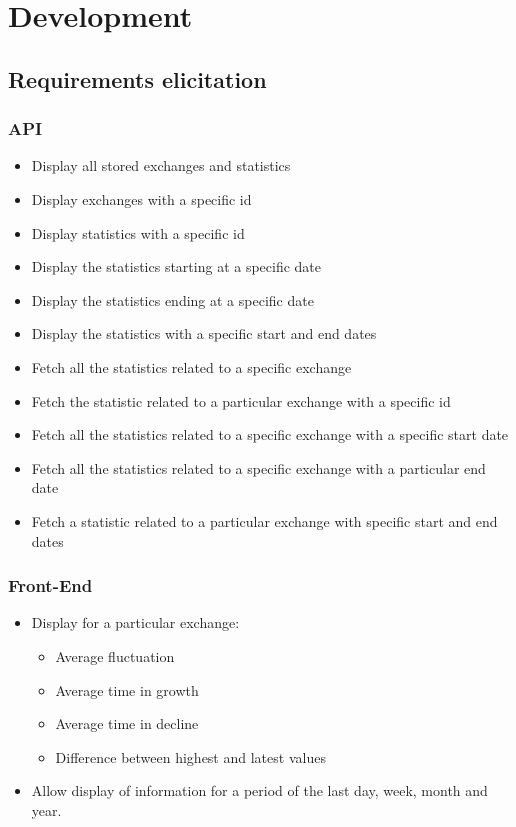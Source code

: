 \chapter{Development}
\section{Requirements elicitation}
\subsection{API}
\begin{itemize}
    \item Display all stored exchanges and statistics
    \item Display exchanges with a specific id
    \item Display statistics with a specific id
    \item Display the statistics starting at a specific date
    \item Display the statistics ending at a specific date
    \item Display the statistics with a specific start and end dates
    \item Fetch all the statistics related to a specific exchange
    \item Fetch the statistic related to a particular exchange with a specific id
    \item Fetch all the statistics related to a specific exchange with a specific start date
    \item Fetch all the statistics related to a specific exchange with a particular end date
    \item Fetch a statistic related to a particular exchange with specific start and end dates
\end{itemize}

\subsection{Front-End}
\begin{itemize}
    \item Display for a particular exchange:
    \begin{itemize}
        \item Average fluctuation
        \item Average time in growth
        \item Average time in decline
        \item Difference between highest and latest values
    \end{itemize}
    \item Allow display of information for a period of the last day, week, month and year.
\end{itemize}
